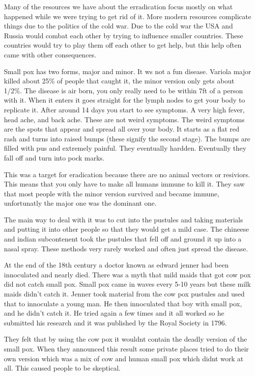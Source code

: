 \documentclass{article}
\begin{document}
Many of the resources we have about the erradication focus mostly on what happened while we were trying to get rid of it. More modern resources complicate things due to the politics of the cold war. Due to the cold war the USA and Russia would combat each other by trying to influence smaller countries. These countries would try to play them off each other to get help, but this help often came with other consequences.

Small pox has two forms, major and minor. It ws not a fun disease. Variola major killed about 25\% of people that caught it, the minor version only gets about 1/2\%. The disease is air born, you only really need to be within 7ft of a person with it. When it enters it goes straight for the lymph nodes to get your body to replicate it. After around 14 days you start to see symptoms. A very high fever, head ache, and back ache. These are not weird symptoms. The weird symptoms are the spots that appear and spread all over your body. It starts as a flat red rash and turns into raised bumps (these signify the second stage). The bumps are filled with pus and extremely painful. They eventually hardden. Eventually they fall off and turn into pock marks.

This was a target for eradication because there are no animal vectors or resiviors. This means that you only have to make all humans immune to kill it. They saw that most people with the minor version survived and became immune, unfortunatly the major one was the dominant one.

The main way to deal with it was to cut into the pustules and taking materials and putting it into other people so that they would get a mild case. The chineese and indian subcontenent took the pustules that fell off and ground it up into a nasal spray. These methods very rarely worked and often just spread the disease.

At the end of the 18th century a doctor known as edward jenner had been innoculated and nearly died. There was a myth that mild maids that got cow pox did not catch small pox. Small pox came in waves every 5-10 years but these milk maids didn't catch it. Jenner took material from the cow pox pustules and used that to innoculate a young man. He then innoculated that boy with small pox, and he didn't catch it. He tried again a few times and it all worked so he submitted his research and it was published by the Royal Society in 1796.

They felt that by using the cow pox it wouldnt contain the deadly version of the small pox. When they announced this result some private places tried to do their own version which was a mix of cow and human small pox which didnt work at all. This caused people to be skeptical.
\end{document}
